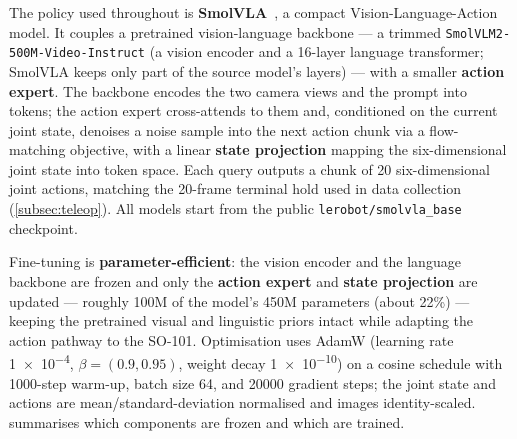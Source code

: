 The policy used throughout is \textbf{SmolVLA}~\cite{shukor2025smolvla}, a compact Vision-Language-Action model. It couples a pretrained vision-language backbone --- a trimmed \texttt{SmolVLM2-500M-Video-Instruct} (a vision encoder and a 16-layer language transformer; SmolVLA keeps only part of the source model's layers) --- with a smaller \textbf{action expert}. The backbone encodes the two camera views and the prompt into tokens; the action expert cross-attends to them and, conditioned on the current joint state, denoises a noise sample into the next action chunk via a flow-matching objective, with a linear \textbf{state projection} mapping the six-dimensional joint state into token space. Each query outputs a chunk of 20 six-dimensional joint actions, matching the 20-frame terminal hold used in data collection (\cref{subsec:teleop}). All models start from the public \texttt{lerobot/smolvla\_base} checkpoint.

Fine-tuning is \textbf{parameter-efficient}: the vision encoder and the language backbone are frozen and only the \textbf{action expert} and \textbf{state projection} are updated --- roughly \num{100}M of the model's \num{450}M parameters (about 22\%) --- keeping the pretrained visual and linguistic priors intact while adapting the action pathway to the SO-101. Optimisation uses AdamW (learning rate \num{1e-4}, $\beta=(0.9,0.95)$, weight decay \num{1e-10}) on a cosine schedule with 1000-step warm-up, batch size 64, and \num{20000} gradient steps; the joint state and actions are mean/standard-deviation normalised and images identity-scaled.  summarises which components are frozen and which are trained.

